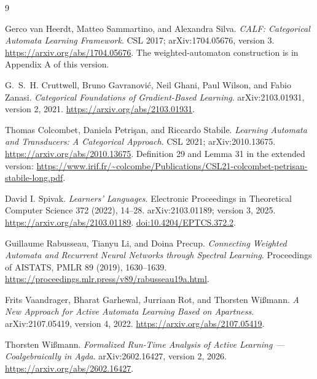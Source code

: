 \documentclass[11pt]{article}
\theoremstyle{definition}
\begin{document}
\begin{thebibliography}{9}

Gerco van Heerdt, Matteo Sammartino, and Alexandra Silva.
\emph{CALF: Categorical Automata Learning Framework}.
CSL 2017; arXiv:1704.05676, version 3.
\url{https://arxiv.org/abs/1704.05676}.
The weighted-automaton construction is in Appendix A of this version.

G.~S.~H. Cruttwell, Bruno Gavranovi\'{c}, Neil Ghani, Paul Wilson, and Fabio Zanasi.
\emph{Categorical Foundations of Gradient-Based Learning}.
arXiv:2103.01931, version 2, 2021.
\url{https://arxiv.org/abs/2103.01931}.

Thomas Colcombet, Daniela Petri\c{s}an, and Riccardo Stabile.
\emph{Learning Automata and Transducers: A Categorical Approach}.
CSL 2021; arXiv:2010.13675.
\url{https://arxiv.org/abs/2010.13675}.
Definition 29 and Lemma 31 in the extended version:
\url{https://www.irif.fr/~colcombe/Publications/CSL21-colcombet-petrisan-stabile-long.pdf}.

David I. Spivak.
\emph{Learners' Languages}.
Electronic Proceedings in Theoretical Computer Science 372 (2022), 14--28.
arXiv:2103.01189; version 3, 2025.
\url{https://arxiv.org/abs/2103.01189}.
\href{https://doi.org/10.4204/EPTCS.372.2}{doi:10.4204/EPTCS.372.2}.

Guillaume Rabusseau, Tianyu Li, and Doina Precup.
\emph{Connecting Weighted Automata and Recurrent Neural Networks through
Spectral Learning}.
Proceedings of AISTATS, PMLR 89 (2019), 1630--1639.
\url{https://proceedings.mlr.press/v89/rabusseau19a.html}.

Frits Vaandrager, Bharat Garhewal, Jurriaan Rot, and Thorsten Wi\ss mann.
\emph{A New Approach for Active Automata Learning Based on Apartness}.
arXiv:2107.05419, version 4, 2022.
\url{https://arxiv.org/abs/2107.05419}.

Thorsten Wi\ss mann.
\emph{Formalized Run-Time Analysis of Active Learning --- Coalgebraically in Agda}.
arXiv:2602.16427, version 2, 2026.
\url{https://arxiv.org/abs/2602.16427}.

\end{thebibliography}
\end{document}
